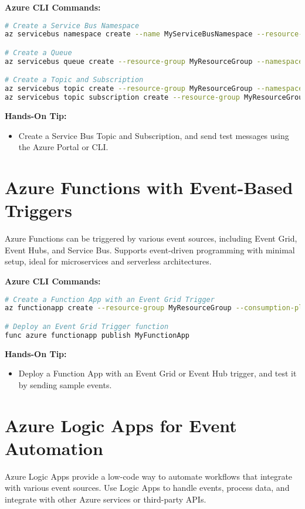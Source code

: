 \documentclass{article}
\begin{document}
\textbf{Azure CLI Commands:}
\begin{lstlisting}[language=bash]
# Create a Service Bus Namespace
az servicebus namespace create --name MyServiceBusNamespace --resource-group MyResourceGroup --location eastus

# Create a Queue
az servicebus queue create --resource-group MyResourceGroup --namespace-name MyServiceBusNamespace --name MyQueue

# Create a Topic and Subscription
az servicebus topic create --resource-group MyResourceGroup --namespace-name MyServiceBusNamespace --name MyTopic
az servicebus topic subscription create --resource-group MyResourceGroup --namespace-name MyServiceBusNamespace --topic-name MyTopic --name MySubscription
\end{lstlisting}

\textbf{Hands-On Tip:}
\begin{itemize}
    \item Create a Service Bus Topic and Subscription, and send test messages using the Azure Portal or CLI.
\end{itemize}

\section{Azure Functions with Event-Based Triggers}
Azure Functions can be triggered by various event sources, including Event Grid, Event Hubs, and Service Bus. Supports event-driven programming with minimal setup, ideal for microservices and serverless architectures.

\textbf{Azure CLI Commands:}
\begin{lstlisting}[language=bash]
# Create a Function App with an Event Grid Trigger
az functionapp create --resource-group MyResourceGroup --consumption-plan-location eastus --name MyFunctionApp --storage-account mystorageaccount --runtime dotnet

# Deploy an Event Grid Trigger function
func azure functionapp publish MyFunctionApp
\end{lstlisting}

\textbf{Hands-On Tip:}
\begin{itemize}
    \item Deploy a Function App with an Event Grid or Event Hub trigger, and test it by sending sample events.
\end{itemize}

\section{Azure Logic Apps for Event Automation}
Azure Logic Apps provide a low-code way to automate workflows that integrate with various event sources. Use Logic Apps to handle events, process data, and integrate with other Azure services or third-party APIs.
\end{document}
